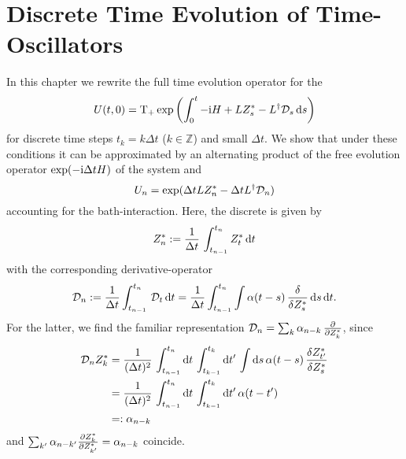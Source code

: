 \chapter{Discrete Time Evolution of Time-Oscillators}
\label{cha:timeo}

In this chapter we rewrite the full time evolution operator for the \NMSSE
\begin{equation}
  U(t, 0) = \Texp \left( \int_0^t -\ii\Hsys + L \ZZ_s - \adj{L} \adjZZ_s \dd s \right)
  \label{eq:timeo.time_ev_op}
\end{equation}
for discrete time steps $t_k = k \Delta t$ ($k \in \mathbb{Z}$) and small $\Delta t$.
We show that under these conditions it can be approximated by an alternating product of the free evolution operator $\exp(-\ii\Delta t \Hsys)$ of the system and
\begin{equation}
  U_n = \exp(\Delta t L \ZZ_n - \Delta t \adj{L} \adjZZ_n)
  \label{eq:timeo.discrete_timeev}
\end{equation}
accounting for the bath-interaction.
Here, the discrete  is given by
\begin{equation}
  {Z}^*_n := \frac{1}{\Delta t}\, \int_{t_{n-1}}^{t_{n}} {Z}^*_t \, \mathrm{d} t
  \label{eq:timeo.discrete_noise}
\end{equation}
with the corresponding derivative-operator
\begin{equation*}
  \mathcal{D}_n := \frac{1}{\Delta t} \int_{t_{n-1}}^{t_{n}} \, \mathcal{D}_t \, \mathrm{d} t = \frac{1}{\Delta t} \int_{t_{n-1}}^{t_{n}} \int \alpha(t - s) \, \frac{\delta}{\delta {Z}^*_s} \, \mathrm{d} s \, \mathrm{d} t.
\end{equation*}
For the latter, we find the familiar representation $\mathcal{D}_n = \sum_k \alpha_{n-k} \, \frac{\partial}{\partial {Z}^*_k}$, since
\begin{align*}
  \mathcal{D}_n {Z}^*_k &= \frac{1}{(\Delta t)^2}\, \int_{t_{n-1}}^{t_{n}}\mathrm{d}t\, \int_{t_{k-1}}^{t_{k}}\mathrm{d}t'\, \int\mathrm{d}s \, \alpha(t - s) \, \frac{\delta {Z}^*_{t'}}{\delta {Z}^*_{s}} \\
  &= \frac{1}{(\Delta t)^2}\, \int_{t_{n-1}}^{t_{n}}\mathrm{d}t\,  \int_{t_{k-1}}^{t_{k}}\mathrm{d}t'\, \alpha(t - t') \\
  &=: \alpha_{n-k}
\end{align*}
and $\sum_{k'} \alpha_{n-k'} \frac{\partial {Z}^*_k}{\partial {Z}^*_{k'}} = \alpha_{n-k}$ coincide.

